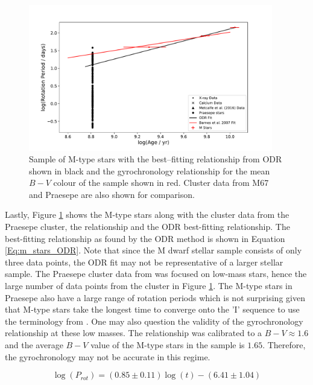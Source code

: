 \begin{figure}[!ht]
    \centering
    \includegraphics[width=0.95\textwidth]{Figures/5-Activity_rotation/m_prot_v_age.pdf}
    \caption[Rotation period as a function of age for M-type stars]{Sample of M-type stars with the best--fitting relationship from ODR shown in black and the \citet{Barnes_2007} gyrochronology relationship for the mean $B-V$ colour of the sample shown in red. Cluster data from M67 and Praesepe are also shown for comparison.}
    \label{fig:m_prot_v_age}
\end{figure}

Lastly, Figure \ref{fig:m_prot_v_age} shows the M-type stars along with the cluster data from the Praesepe cluster, the \citet{Barnes_2007} relationship and the ODR best-fitting relationship. The best-fitting relationship as found by the ODR method is shown in Equation \ref{Eq:m_stars_ODR}. Note that since the M dwarf stellar sample consists of only three data points, the ODR fit may not be representative of a larger stellar sample. The Praesepe cluster data from \citet{Douglas_etal_2017} was focused on low-mass stars, hence the large number of data points from the cluster in Figure \ref{fig:m_prot_v_age}. The M-type stars in Praesepe also have a large range of rotation periods which is not surprising given that M-type stars take the longest time to converge onto the 'I' sequence to use the terminology from \citet{Barnes_2003}. One may also question the validity of the gyrochronology relationship at these low masses. The \citet{Barnes_2007} relationship was calibrated to a $B-V \approx 1.6$ and the average $B-V$ value of the M-type stars in the sample is $1.65$. Therefore, the gyrochronology may not be accurate in this regime.

\begin{equation}
    \log(P_{rot}) = (0.85 \pm 0.11)\log(t) - (6.41 \pm 1.04)
    \label{Eq:m_stars_ODR}
\end{equation}

